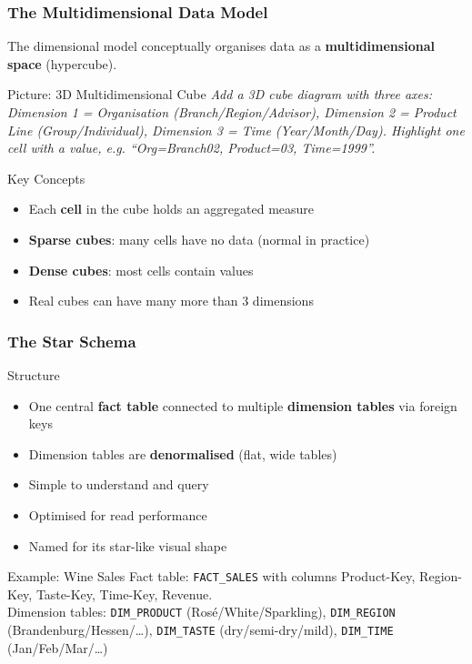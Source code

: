 \begin{frame}
  \frametitle{The Multidimensional Data Model}

  The dimensional model conceptually organises data as a
  \textbf{multidimensional space} (hypercube).

  \begin{alertblock}{Picture: 3D Multidimensional Cube}
    \textit{Add a 3D cube diagram with three axes:
    Dimension 1 = Organisation (Branch/Region/Advisor),
    Dimension 2 = Product Line (Group/Individual),
    Dimension 3 = Time (Year/Month/Day).
    Highlight one cell with a value, e.g. ``Org=Branch02, Product=03, Time=1999''.}
  \end{alertblock}

  \begin{block}{Key Concepts}
    \begin{itemize}
      \item Each \textbf{cell} in the cube holds an aggregated measure
      \item \textbf{Sparse cubes}: many cells have no data (normal in practice)
      \item \textbf{Dense cubes}: most cells contain values
      \item Real cubes can have many more than 3 dimensions
    \end{itemize}
  \end{block}
\end{frame}


\begin{frame}
  \frametitle{The Star Schema}

  \begin{block}{Structure}
    \begin{itemize}
      \item One central \textbf{fact table} connected to multiple
        \textbf{dimension tables} via foreign keys
      \item Dimension tables are \textbf{denormalised} (flat, wide tables)
      \item Simple to understand and query
      \item Optimised for read performance
      \item Named for its star-like visual shape
    \end{itemize}
  \end{block}

  \begin{examples}{Example: Wine Sales}
    Fact table: \texttt{FACT\_SALES} with columns Product-Key,
    Region-Key, Taste-Key, Time-Key, Revenue.\\
    Dimension tables: \texttt{DIM\_PRODUCT} (Rosé/White/Sparkling),
    \texttt{DIM\_REGION} (Brandenburg/Hessen/\ldots),
    \texttt{DIM\_TASTE} (dry/semi-dry/mild),
    \texttt{DIM\_TIME} (Jan/Feb/Mar/\ldots)
  \end{examples}
\end{frame}

